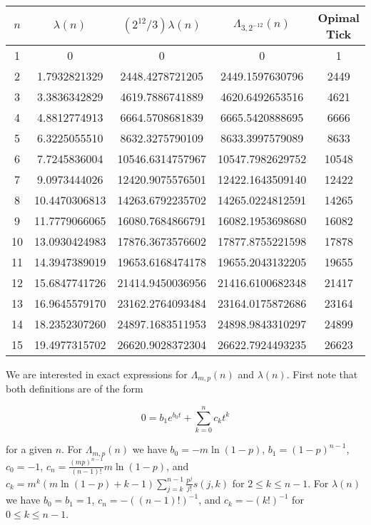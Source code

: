 \documentclass[12pt]{article}
\theoremstyle{plain}
\theoremstyle{definition}
\theoremstyle{remark}
\theoremstyle{definition}
\begin{document}
\begin{center}
\begin{tabular}{| c | c | c | c | c |}
\hline
 $n$ & $\lambda(n)$ & $(2^{12}/3)\lambda(n)$ & $\Lambda_{3,2^{-12}}(n)$ & Opimal Tick\\ 
 \hline
1 & 0 & 0 & 0 & 1\\ 
2 & 1.7932821329 & 2448.4278721205 & 2449.1597630796 & 2449\\
3 & 3.3836342829 & 4619.7886741889 & 4620.6492653516 & 4621\\
4 & 4.8812774913 & 6664.5708681839 & 6665.5420888695 & 6666\\
5 & 6.3225055510 & 8632.3275790109 & 8633.3997579089 & 8633\\
6 & 7.7245836004 & 10546.6314757967 & 10547.7982629752 & 10548\\
7 & 9.0973444026 & 12420.9075576501 & 12422.1643509140 & 12422\\
8 & 10.4470306813 & 14263.6792235702 & 14265.0224812591 & 14265\\
9 & 11.7779066065 & 16080.7684866791 & 16082.1953698680 & 16082\\
10 & 13.0930424983 & 17876.3673576602 & 17877.8755221598 & 17878\\
11 & 14.3947389019 & 19653.6168474178 & 19655.2043132205 & 19655\\
12 & 15.6847741726 & 21414.9450036956 & 21416.6100682348 & 21417\\
13 & 16.9645579170 & 23162.2764093484 & 23164.0175872686 & 23164\\
14 & 18.2352307260 & 24897.1683511953 & 24898.9843310297 & 24899\\
15 & 19.4977315702 & 26620.9028372304 & 26622.7924493235 & 26623\\
 \hline
\end{tabular}
\end{center}

We are interested in exact expressions for $\Lambda_{m,p}(n)$ and $\lambda(n)$. First note that both definitions are of the form 

\begin{equation*}\label{eq: base eq}
    0 = b_1 e^{b_0 t} + \sum_{k=0}^n c_k t^k
\end{equation*}

for a given $n$. For $\Lambda_{m,p}(n)$ we have $b_0=-m\ln(1-p)$, $b_1=(1-p)^{n-1}$, $c_0=-1$, $c_n=\frac{(mp)^{n-1}}{(n-1)!}m\ln(1-p)$, and $c_k = m^k (m\ln(1-p)+k-1) \sum_{j=k}^{n-1}\frac{p^j}{j!}s(j,k)$ for $2 \leq k\leq n-1$. For $\lambda(n)$ we have $b_0 = b_1 = 1$, $c_n = -((n-1)!)^{-1}$, and $c_k = -(k!)^{-1}$ for $0\leq k \leq n-1$.
\end{document}
